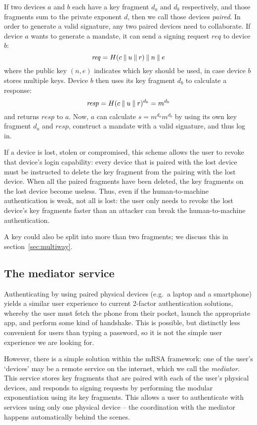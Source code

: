 If two devices $a$ and $b$ each have a key fragment $d_a$ and $d_b$ respectively, and those
fragments sum to the private exponent $d$, then we call those devices \emph{paired}. In order to
generate a valid signature, any two paired devices need to collaborate. If device $a$ wants to
generate a mandate, it can send a signing request $\mathit{req}$ to device $b$:
$$\mathit{req} = H(c \mathbin{\|} u \mathbin{\|} r) \mathbin{\|} n \mathbin{\|} e$$
where the public key $(n, e)$ indicates which key should be used, in case device $b$ stores multiple
keys. Device $b$ then uses its key fragment $d_b$ to calculate a response:
$$\mathit{resp} = H(c \mathbin{\|} u \mathbin{\|} r)^{d_b} = m^{d_b}$$
and returns $\mathit{resp}$ to $a$. Now, $a$ can calculate $s = m^{d_a} m^{d_b}$ by using its own
key fragment $d_a$ and $\mathit{resp}$, construct a mandate with a valid signature, and thus log in.

If a device is lost, stolen or compromised, this scheme allows the user to revoke that device's
login capability: every device that is paired with the lost device must be instructed to delete the
key fragment from the pairing with the lost device. When all the paired fragments have been deleted,
the key fragments on the lost device become useless. Thus, even if the human-to-machine
authentication is weak, not all is lost: the user only needs to revoke the lost device's key
fragments faster than an attacker can break the human-to-machine authentication.

A key could also be split into more than two fragments; we discuss this in section~\ref{sec:multiway}.

\subsection{The mediator service}\label{sec:mediator}

Authenticating by using paired physical devices (e.g.\ a laptop and a smartphone) yields a similar
user experience to current 2-factor authentication solutions, whereby the user must fetch the phone
from their pocket, launch the appropriate app, and perform some kind of handshake. This is
possible, but distinctly less convenient for users than typing a password, so it is not the simple
user experience we are looking for.

However, there is a simple solution within the mRSA framework: one of the user's `devices' may be a
remote service on the internet, which we call the \emph{mediator}. This service stores key fragments
that are paired with each of the user's physical devices, and responds to signing requests by
performing the modular exponentiation using its key fragments. This allows a user to authenticate
with services using only one physical device -- the coordination with the mediator happens
automatically behind the scenes.


